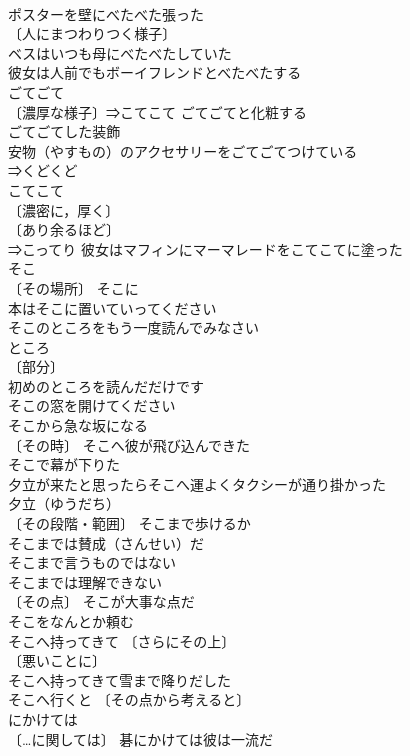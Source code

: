 \documentclass[8pt]{extreport}
\begin{document}
\begin{CJK}{UTF8}{min}
\\	ポスターを壁にべたべた張った 
\\	〔人にまつわりつく様子〕 
\\	ベスはいつも母にべたべたしていた 
\\	彼女は人前でもボーイフレンドとべたべたする 
\\	ごてごて		
\\	〔濃厚な様子〕⇒こてこて ごてごてと化粧する 
\\	ごてごてした装飾 
\\	安物（やすもの）のアクセサリーをごてごてつけている 
\\	⇒くどくど
\\	こてこて		
\\	〔濃密に，厚く〕
\\	〔あり余るほど〕
\\	⇒こってり 彼女はマフィンにマーマレードをこてこてに塗った 
\\	そこ		
\\	〔その場所〕 そこに 
\\	本はそこに置いていってください 
\\	そこのところをもう一度読んでみなさい 
\\	ところ　
\\	〔部分〕
\\	初めのところを読んだだけです 
\\	そこの窓を開けてください 
\\	そこから急な坂になる 
\\	〔その時〕 そこへ彼が飛び込んできた 
\\	そこで幕が下りた 
\\	夕立が来たと思ったらそこへ運よくタクシーが通り掛かった 
\\	夕立（ゆうだち）　
\\	〔その段階・範囲〕 そこまで歩けるか 
\\	そこまでは賛成（さんせい）だ 
\\	そこまで言うものではない 
\\	そこまでは理解できない 
\\	〔その点〕 そこが大事な点だ 
\\	そこをなんとか頼む 
\\	そこへ持ってきて 〔さらにその上〕
\\	〔悪いことに〕
\\	そこへ持ってきて雪まで降りだした 
\\	そこへ行くと 〔その点から考えると〕
\\	にかけては		
\\	〔…に関しては〕 碁にかけては彼は一流だ 

\end{CJK}
\end{document}
